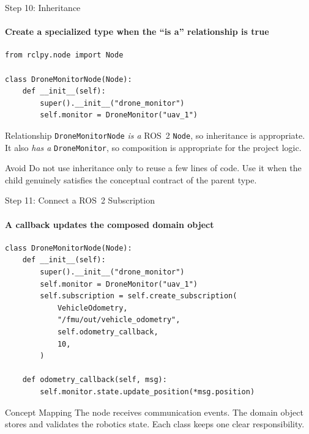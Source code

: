 \begin{frame}[fragile]{Step 10: Inheritance}
\framesubtitle{Create a specialized type when the ``is a'' relationship is true}

\begin{verbatim}
from rclpy.node import Node

class DroneMonitorNode(Node):
    def __init__(self):
        super().__init__("drone_monitor")
        self.monitor = DroneMonitor("uav_1")
\end{verbatim}

\begin{block}{Relationship}
    \texttt{DroneMonitorNode} \textit{is a} ROS~2 \texttt{Node}, so inheritance is
    appropriate. It also \textit{has a} \texttt{DroneMonitor}, so composition is
    appropriate for the project logic.
\end{block}

\begin{alertblock}{Avoid}
    Do not use inheritance only to reuse a few lines of code. Use it when the child
    genuinely satisfies the conceptual contract of the parent type.
\end{alertblock}
\end{frame}


\begin{frame}[fragile]{Step 11: Connect a ROS~2 Subscription}
\framesubtitle{A callback updates the composed domain object}

\begin{verbatim}
class DroneMonitorNode(Node):
    def __init__(self):
        super().__init__("drone_monitor")
        self.monitor = DroneMonitor("uav_1")
        self.subscription = self.create_subscription(
            VehicleOdometry,
            "/fmu/out/vehicle_odometry",
            self.odometry_callback,
            10,
        )

    def odometry_callback(self, msg):
        self.monitor.state.update_position(*msg.position)
\end{verbatim}

\begin{exampleblock}{Concept Mapping}
    The node receives communication events. The domain object stores and validates
    the robotics state. Each class keeps one clear responsibility.
\end{exampleblock}
\end{frame}


